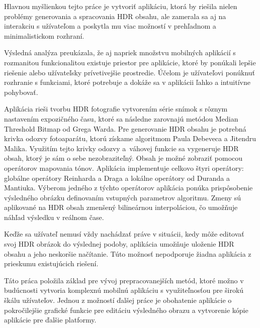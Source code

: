 Hlavnou myšlienkou tejto práce je vytvoriť aplikáciu, ktorá by riešila nielen problémy generovania a spracovania
HDR obsahu, ale zamerala sa aj na interakciu s užívateľom a poskytla mu viac možností v prehľadnom a minimalistickom rozhraní.

Výsledná analýza preukázala, že aj napriek množstvu mobilných aplikácií s rozmanitou funkcionalitou
existuje priestor pre aplikácie, ktoré by ponúkali lepšie riešenie alebo užívateľsky prívetivejšie
prostredie. Účelom je užívateľovi ponúknuť rozhranie s funkciami, ktoré potrebuje a dokáže sa v aplikácii
ľahko a intuitívne pohybovať.

Aplikácia rieši tvorbu HDR fotografie vytvorením série snímok s rôznym nastavením expozičného času, ktoré sa následne
zarovnajú metódou Median Threshold Bitmap od Grega Warda. Pre generovanie HDR obsahu je potrebná krivka odozvy fotoaparátu,
ktorú získame algoritmom Paula Debeveca a Jitendru Malika. Využitím tejto krivky odozvy a~váhovej funkcie sa vygeneruje
HDR obsah, ktorý je sám o sebe nezobraziteľný. Obsah je možné zobraziť pomocou operátorov mapovania tónov. Aplikácia implementuje
celkovo štyri operátory: globálne operátory Reinharda a Draga a lokálne operátory od Duranda a Mantiuka. Výberom jedného
z týchto operátorov aplikácia ponúka prispôsobenie výsledného obrázku definovaním vstupných parametrov algoritmu.
Zmeny sú aplikované na HDR obsah zmenšený bilineárnou interpoláciou, čo umožňuje náhľad výsledku v reálnom čase.

Keďže sa užívateľ nemusí vždy nachádzať práve v situácii, kedy môže editovať svoj HDR obrázok do výslednej podoby,
aplikácia umožňuje uloženie HDR obsahu a jeho neskoršie načítanie. Túto možnosť nepodporuje žiadna aplikácia z prieskumu
existujúcich riešení.

Táto práca položila základ pre vývoj prepracovanejších metód, ktoré možno v budúcnosti vytvoria komplexnú mobilnú aplikáciu
s využiteľnosťou pre širokú škálu užívateľov. Jednou z možností ďalšej práce je obohatenie aplikácie o pokročilejšie grafické
funkcie pre editáciu výsledného obrazu a vytvorenie kópie aplikácie pre ďalšie platformy.
